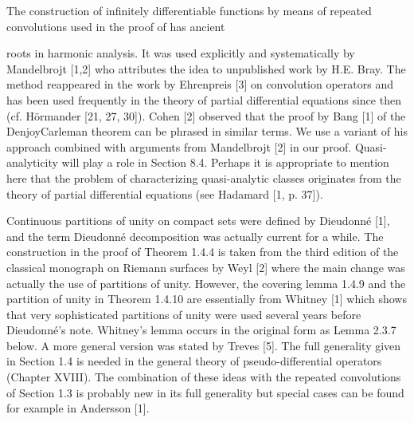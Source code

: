 The construction of infinitely differentiable functions by means of repeated convolutions used in the proof of  has ancient

roots in harmonic analysis. It was used explicitly and systematically by Mandelbrojt [1,2] who attributes the idea to unpublished work by H.E. Bray. The method reappeared in the work by Ehrenpreis [3] on convolution operators and has been used frequently in the theory of partial differential equations since then (cf. Hörmander [21, 27, 30]). Cohen [2] observed that the proof by Bang [1] of the DenjoyCarleman theorem can be phrased in similar terms. We use a variant of his approach combined with arguments from Mandelbrojt [2] in our proof. Quasi-analyticity will play a role in Section 8.4. Perhaps it is appropriate to mention here that the problem of characterizing quasi-analytic classes originates from the theory of partial differential equations (see Hadamard [1, p. 37]).

Continuous partitions of unity on compact sets were defined by Dieudonné [1], and the term Dieudonné decomposition was actually current for a while. The construction in the proof of Theorem 1.4.4 is taken from the third edition of the classical monograph on Riemann surfaces by Weyl [2] where the main change was actually the use of partitions of unity. However, the covering lemma 1.4.9 and the partition of unity in Theorem 1.4.10 are essentially from Whitney [1] which shows that very sophisticated partitions of unity were used several years before Dieudonné's note. Whitney's lemma occurs in the original form as Lemma 2.3.7 below. A more general version was stated by Treves [5]. The full generality given in Section 1.4 is needed in the general theory of pseudo-differential operators (Chapter XVIII). The combination of these ideas with the repeated convolutions of Section 1.3 is probably new in its full generality but special cases can be found for example in Andersson [1].
